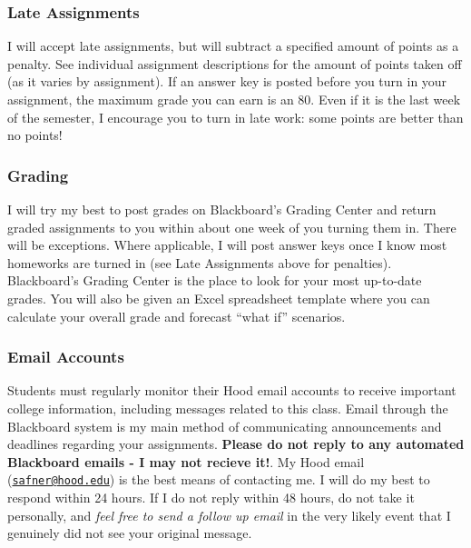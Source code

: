 \documentclass{article}
\begin{document}
\hypertarget{late-assignments}{%
\subsubsection{Late Assignments}\label{late-assignments}}

I will accept late assignments, but will subtract a specified amount of
points as a penalty. See individual assignment descriptions for the
amount of points taken off (as it varies by assignment). If an answer
key is posted before you turn in your assignment, the maximum grade you
can earn is an 80. Even if it is the last week of the semester, I
encourage you to turn in late work: some points are better than no
points!

\hypertarget{grading}{%
\subsubsection{Grading}\label{grading}}

I will try my best to post grades on Blackboard's Grading Center and
return graded assignments to you within about one week of you turning
them in. There will be exceptions. Where applicable, I will post answer
keys once I know most homeworks are turned in (see Late Assignments
above for penalties). Blackboard's Grading Center is the place to look
for your most up-to-date grades. You will also be given an Excel
spreadsheet template where you can calculate your overall grade and
forecast ``what if'' scenarios.

\hypertarget{email-accounts}{%
\subsubsection{Email Accounts}\label{email-accounts}}

Students must regularly monitor their Hood email accounts to receive
important college information, including messages related to this class.
Email through the Blackboard system is my main method of communicating
announcements and deadlines regarding your assignments. \textbf{Please
do not reply to any automated Blackboard emails - I may not recieve
it!}. My Hood email
(\href{mailto:safner@hood.edu}{\nolinkurl{safner@hood.edu}}) is the best
means of contacting me. I will do my best to respond within 24 hours. If
I do not reply within 48 hours, do not take it personally, and
\emph{feel free to send a follow up email} in the very likely event that
I genuinely did not see your original message.
\end{document}
